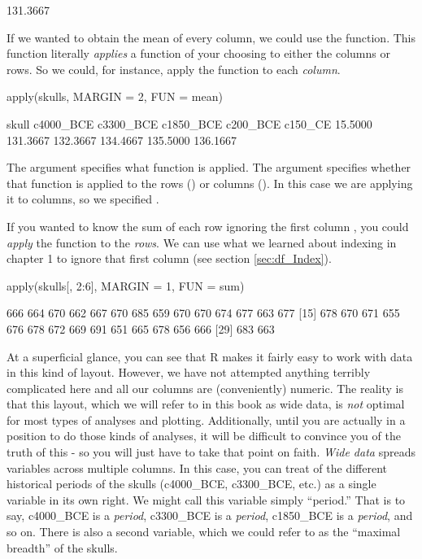 \begin{outR}
[1] 131.3667
\end{outR}

If we wanted to obtain the mean of every column, we could use the  function. This function literally \textit{applies} a function of your choosing to either the columns or rows. So we could, for instance, apply the  function to each \textit{column}.

\begin{inR}
apply(skulls, MARGIN = 2, FUN = mean)
\end{inR}

\begin{outR}
    skull c4000_BCE c3300_BCE c1850_BCE  c200_BCE   c150_CE 
  15.5000  131.3667  132.3667  134.4667  135.5000  136.1667 
\end{outR}

\noindent
The argument  specifies what function is applied. The argument  specifies whether that function is applied to the rows () or columns (). In this case we are applying it to columns, so we specified .

If you wanted to know the sum of each row ignoring the first column , you could \textit{apply} the  function to the \textit{rows}. We can use what we learned about indexing in chapter 1 to ignore that first column (see section \ref{sec:df_Index}).

\begin{inR}
apply(skulls[, 2:6], MARGIN = 1, FUN = sum)
\end{inR}

\begin{outR}
 [1] 666 664 670 662 667 670 685 659 670 670 674 677 663 677
[15] 678 670 671 655 676 678 672 669 691 651 665 678 656 666
[29] 683 663
\end{outR}

At a superficial glance, you can see that R makes it fairly easy to work with data in this kind of layout. However, we have not attempted anything terribly complicated here and all our columns are (conveniently) numeric. The reality is that this layout, which we will refer to in this book as \gls{wide data}, is \textit{not} optimal for most types of analyses and plotting. Additionally, until you are actually in a position to do those kinds of analyses, it will be difficult to convince you of the truth of this - so you will just have to take that point on faith. \textit{Wide data} spreads variables across multiple columns. In this case, you can treat of the different historical periods of the skulls (c4000\_BCE, c3300\_BCE, etc.) as a single variable in its own right. We might call this variable simply ``period.'' That is to say, c4000\_BCE is a \textit{period}, c3300\_BCE is a \textit{period}, c1850\_BCE is a \textit{period}, and so on. There is also a second variable, which we could refer to as the ``maximal breadth'' of the skulls.

